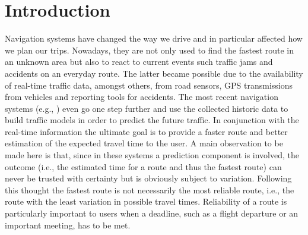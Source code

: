 \vspace{-0.4cm}
\section{Introduction}

Navigation systems have changed the way we drive and in particular affected how
we plan our trips. Nowadays, they are not only used to find the fastest
route in an unknown area but also to react to current events such traffic jams
and accidents on an everyday route. The latter became possible due to the
availability of real-time traffic data, amongst others, from road sensors, GPS
transmissions from vehicles and reporting tools for accidents. The most recent
navigation systems (e.g., \cite{PanDemShaGup13}) even go one step further and
use the collected historic data to build traffic models in order to predict the future traffic. In
conjunction with the real-time information the ultimate goal is to provide a faster
route and better estimation of the expected travel time to the user. A
main observation to be made here is that, since in these systems a prediction
component is involved, the outcome (i.e., the estimated time for a route and
thus the fastest route) can never be trusted with certainty but is
obviously subject to variation. Following this thought the fastest route is not
necessarily the most reliable route, i.e., the route with the least variation in
possible travel times. Reliability of a route is particularly important to users
when a deadline, such as a flight departure or an important meeting, has to be
met. 


